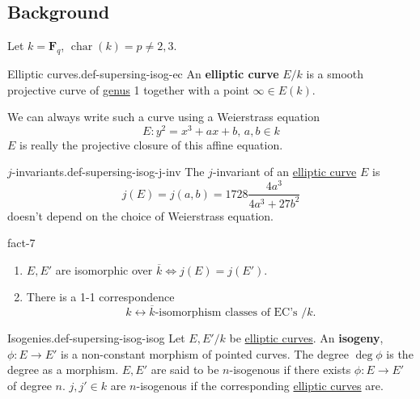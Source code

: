 \documentclass[10pt,]{book}
\newcommand{\terminology}[1]{\textbf{#1}}
\numberwithin{equation}{section}
\newcommand{\FF}{\mathbf{F}}
\DeclareMathOperator{\characteristic}{char}
\begin{document}
\subsection[{Background}]{Background}\label{subsec-supersing-isog-background}
\hypertarget{p-785}{}%
Let \(k = \FF_q\), \(\characteristic (k) = p \ne 2,3\).%
\begin{definition}{Elliptic curves.}{def-supersing-isog-ec}%
\hypertarget{p-786}{}%
An \terminology{elliptic curve} \(E/k\) is a smooth projective curve of \hyperref[fact-existance-genus]{genus} 1 together with a point \(\infty \in E(k)\).%
\end{definition}
\hypertarget{p-787}{}%
We can always write such a curve using a Weierstrass equation%
\begin{equation*}
E\colon y^2=  x^3  + ax  +b,\,a,b    \in k
\end{equation*}
\(E\) is really the projective closure of this affine equation.%
\begin{definition}{\(j\)-invariants.}{def-supersing-isog-j-inv}%
\hypertarget{p-788}{}%
The \(j\)-invariant of an \hyperref[def-supersing-isog-ec]{elliptic curve} \(E\) is%
\begin{equation*}
j(E) = j(a,b) = 1728 \frac{4a^3}{4a^3 + 27b^2}
\end{equation*}
doesn't depend on the choice of Weierstrass equation.%
\end{definition}
\begin{fact}{}{}{fact-7}%
\hypertarget{p-789}{}%
\leavevmode%
\begin{enumerate}
\item\hypertarget{li-183}{}\(E,E'\) are isomorphic over \(\overline k \iff j(E)  = j(E')\).%
\item\hypertarget{li-184}{}There is a 1-1 correspondence%
\begin{equation*}
k \leftrightarrow \overline k \text{-isomorphism classes of EC's }/k\text{.}
\end{equation*}
%
\end{enumerate}
%
\end{fact}
\begin{definition}{Isogenies.}{def-supersing-isog-isog}%
\hypertarget{p-790}{}%
Let \(E,E'/k\) be \hyperref[def-supersing-isog-ec]{elliptic curves}. An \terminology{isogeny}, \(\phi \colon E\to E'\) is a non-constant morphism of pointed curves. The degree \(\deg \phi \) is the degree as a morphism. \(E,E'\) are said to be \(n\)-isogenous if there exists \(\phi\colon E\to E'\) of degree \(n\). \(j,j'\in k\) are \(n\)-isogenous if the corresponding \hyperref[def-supersing-isog-ec]{elliptic curves} are.%
\end{definition}
\end{document}
